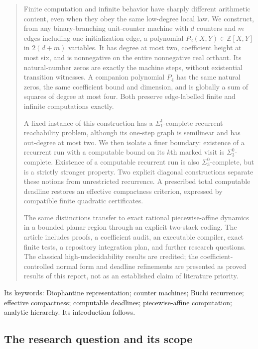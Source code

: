 \documentclass[11pt,letterpaper]{article}
\theoremstyle{definition}
\theoremstyle{remark}
\newcommand{\Z}{\mathbb Z}
\newcommand{\1}{\mathbf 1}
\newcommand{\srctag}[1]{\texorpdfstring{\hspace{0.4em}{\normalfont\small\color{accent}[source #1]}}{ [source #1]}}
\begin{document}
\begin{quote}\small
Finite computation and infinite behavior have sharply different arithmetic
content, even when they obey the same low-degree local law. We construct, from
any binary-branching unit-counter machine with $d$ counters and $m$ edges
including one initialization edge, a polynomial
$P_2(X,Y)\in\Z[X,Y]$ in $2(d+m)$ variables. It has degree at most two,
coefficient height at most six, and is nonnegative on the entire nonnegative
real orthant. Its natural-number zeros are exactly the machine steps, without
existential transition witnesses. A companion polynomial $P_4$ has the same
natural zeros, the same coefficient bound and dimension, and is globally a sum
of squares of degree at most four. Both preserve edge-labelled finite and
infinite computations exactly.

A fixed instance of this construction has a $\Sigma^1_1$-complete recurrent
reachability problem, although its one-step graph is semilinear and has
out-degree at most two. We then isolate a finer boundary: existence of a
recurrent run with a computable bound on its $k$th marked visit is
$\Sigma^0_3$-complete. Existence of a computable recurrent run is also
$\Sigma^0_3$-complete, but is a strictly stronger property. Two explicit
diagonal constructions separate these notions from unrestricted recurrence.
A prescribed total computable deadline restores an effective compactness
criterion, expressed by compatible finite quadratic certificates.

The same distinctions transfer to exact rational piecewise-affine dynamics in
a bounded planar region through an explicit two-stack coding. The article
includes proofs, a coefficient audit, an executable compiler, exact finite
tests, a repository integration plan, and further research questions. The
classical high-undecidability results are credited; the coefficient-controlled
normal form and deadline refinements are presented as proved results of this
report, not as an established claim of literature priority.
\end{quote}
Its keywords: Diophantine representation; counter machines; B\"uchi recurrence; effective
compactness; computable deadlines; piecewise-affine computation; analytic hierarchy. Its
introduction follows.
\subsection{The research question and its scope\srctag{11}}
\end{document}
